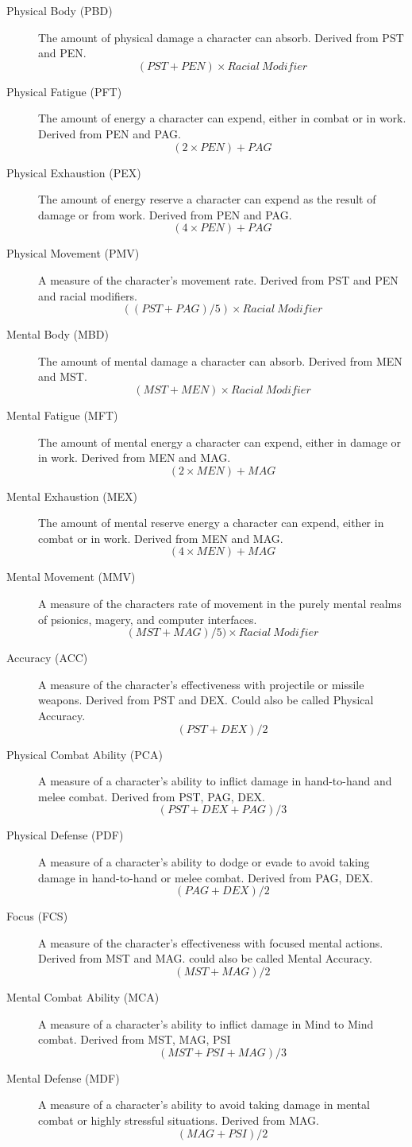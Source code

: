 \begin{description}
	\item[Physical Body (PBD)]
	The amount of physical damage a character can absorb. Derived from PST
	and PEN.
	\[(PST+PEN) \times {Racial\ Modifier}\]
	\item[Physical Fatigue (PFT)]
	The amount of energy a character can expend, either in combat or in
	work. Derived from PEN and PAG.
	\[(2 \times PEN)+PAG\]
	\item[Physical Exhaustion (PEX)]
	The amount of energy reserve a character can expend as the result of
	damage or from work. Derived from PEN and PAG.
	\[(4 \times PEN)+PAG\]
	\item[Physical Movement (PMV)]
	A measure of the character's movement rate. Derived from PST and 
	PEN and	racial modifiers.
	\[((PST+PAG)/5) \times {Racial\ Modifier}\]
	\item[Mental Body (MBD)]
	The amount of mental damage a character can absorb. Derived from MEN and MST.
	\[(MST+MEN) \times {Racial\ Modifier}\]
	\item[Mental Fatigue (MFT)]
	The amount of mental energy a character can expend, either in damage
	or in work. Derived from MEN and MAG.
	\[(2 \times MEN)+MAG\]
	\item[Mental Exhaustion (MEX)]
	The amount of mental reserve energy a character can expend, either in combat
	or in work. Derived from MEN and MAG.
	\[(4 \times MEN)+MAG\]
	\item[Mental Movement (MMV)]
	A measure of the characters rate of movement in the purely mental
	realms of psionics, magery, and computer interfaces.
	\[(MST+MAG)/5)\times {Racial\ Modifier}\]
	\item[Accuracy (ACC)]
	A measure of the character's effectiveness with projectile or missile
	weapons. Derived from PST and DEX. Could also be called Physical
	Accuracy.
	\[(PST+DEX)/2		  \]
	\item[Physical Combat Ability (PCA)]
	A measure of a character's ability to in\-flict
	dam\-age in hand-to-hand and melee combat. Derived from
	PST, PAG, DEX.
	\[(PST+DEX+PAG)/3 \]
	\item[Physical Defense (PDF)]
	A measure of a character's ability to dodge or evade  to avoid
	taking damage in hand-to-hand or melee combat. Derived
	from PAG, DEX.
	\[(PAG+DEX)/2 \]
	\item[Focus	(FCS)]
	A measure of the character's effectiveness with focused mental
	actions. Derived from MST and MAG. could also be called Mental
	Accuracy.
	\[(MST+MAG)/2 \]
	\item[Mental Combat Ability (MCA)]
	A measure of a character's ability to inflict damage in Mind to Mind
	combat. Derived from MST, MAG, PSI
	\[(MST+PSI+MAG)/3 \]
	\item[Mental Defense (MDF)]
	A measure of a character's ability to avoid taking damage in mental
	combat or highly stressful situations. Derived from MAG.
	\[(MAG+PSI)/2 \]
\end{description}

